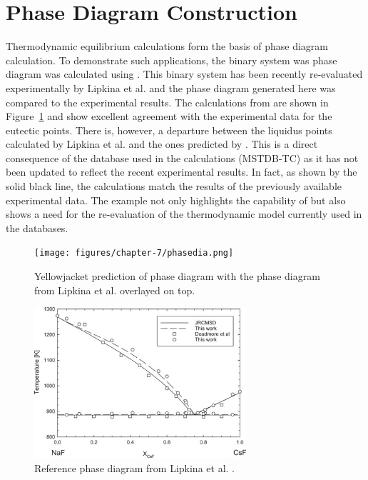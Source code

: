 \section{Phase Diagram Construction}
	Thermodynamic equilibrium calculations form the basis of phase diagram calculation. To demonstrate such applications, the  binary system was phase diagram was calculated using {\GEM}. This binary system has been recently re-evaluated experimentally by Lipkina et al. \cite{Lipkina:2022aa} and the phase diagram generated here was compared to the experimental results. The calculations from {\GEM} are shown in Figure~\ref{fig:res_phased} and show excellent agreement with the experimental data for the eutectic points. There is, however, a departure between the liquidus points calculated by Lipkina et al. and the ones predicted by {\YJ}. This is a direct consequence of the database used in the calculations (MSTDB-TC) as it has not been updated to reflect the recent experimental results. In fact, as shown by the solid black line, the calculations match the results of the previously available experimental data. The example not only highlights the capability of {\GEM} but also shows a need for the re-evaluation of the  thermodynamic model currently used in the databases.
\begin{figure}
         \centering
         \texttt{[image: figures/chapter-7/phasedia.png]}
 	 \caption[Yellowjacket prediction of  phase diagram.]{Yellowjacket prediction of  phase diagram with the phase diagram from Lipkina et al. \cite{Lipkina:2022aa} overlayed on top.}
	 \label{fig:res_phased}
\end{figure}
\begin{figure}
         \centering
         \includegraphics[width=0.7\textwidth]{figures/chapter-7/pdo.png}
         \caption[Reference  phase  diagram from Lipkina et al.]{Reference  phase  diagram from Lipkina et al. \cite{Lipkina:2022aa}.}
     \label{fig:res_refdia}
\end{figure}

